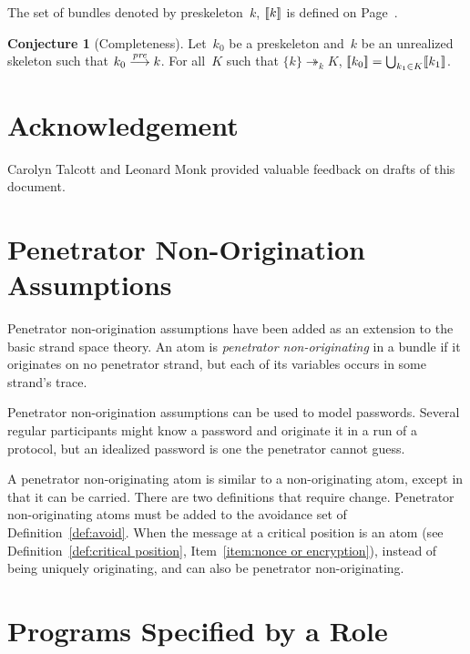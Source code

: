 \documentclass[12pt]{report}
\theoremstyle{definition}
\newtheorem{conj}[thm]{Conjecture}
\begin{document}
The set of bundles denoted by preskeleton~$k$, $[\![k]\!]$ is
defined on Page~\pageref{def:preskeleton denotation}.

\begin{conj}[Completeness]\label{cnj:completeness}
Let~$k_0$ be a preskeleton and~$k$ be an unrealized skeleton such that
$k_0\stackrel{\operatorname{\mathit{pre}}}{\longrightarrow}k$.  For all~$K$ such that $\{k\}\twoheadrightarrow_k
K$, $[\![k_0]\!]=\bigcup_{k_1\in K}[\![k_1]\!]$.
\end{conj}

\chapter*{Acknowledgement}

Carolyn Talcott and Leonard Monk provided valuable feedback on drafts
of this document.

\appendix

\chapter{Penetrator Non-Origination Assumptions}\relax
\label{chp:penetrator non-origination}

Penetrator non-origination assumptions have been added as an extension
to the basic strand space theory.  An atom is \emph{penetrator
  non-originating} in a bundle if it originates on no penetrator
strand, but each of its variables occurs in some strand's trace.

Penetrator non-origination assumptions can be used to model
passwords.  Several regular participants might know a password and
originate it in a run of a protocol, but an idealized password is one
the penetrator cannot guess.

A penetrator non-originating atom is similar to a non-originating
atom, except in that it can be carried.  There are two definitions
that require change.  Penetrator non-originating atoms must be added
to the avoidance set of Definition~\ref{def:avoid}.  When the message
at a critical position is an atom (see Definition~\ref{def:critical
  position}, Item~\ref{item:nonce or encryption}), instead of being
uniquely originating, and can also be penetrator non-originating.

\chapter{Programs Specified by a Role}\label{chp:traces}
\end{document}
